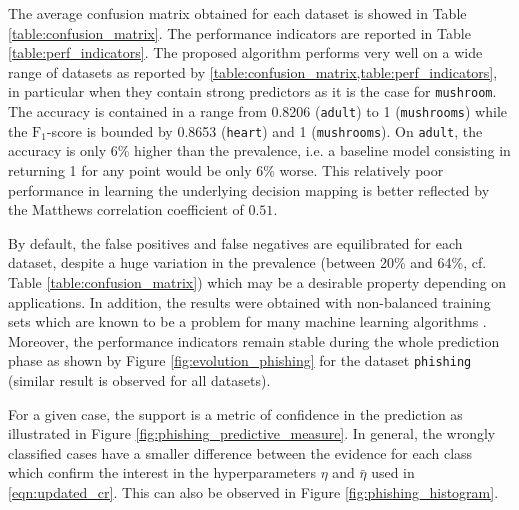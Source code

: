 \documentclass[preprint,12pt]{elsarticle}
\theoremstyle{definition}
\begin{document}
The average confusion matrix obtained for each dataset is showed in Table \ref{table:confusion_matrix}. The performance indicators are reported in Table \ref{table:perf_indicators}. The proposed algorithm performs very well on a wide range of datasets as reported by \cref{table:confusion_matrix,table:perf_indicators}, in particular when they contain strong predictors as it is the case for \texttt{mushroom}. The accuracy is contained in a range from 0.8206 (\texttt{adult}) to 1 (\texttt{mushrooms}) while the $\text{F}_1$-score is bounded by 0.8653 (\texttt{heart}) and 1 (\texttt{mushrooms}). On \texttt{adult}, the accuracy is only 6\% higher than the prevalence, i.e. a baseline model consisting in returning 1 for any point would be only 6\% worse. This relatively poor performance in learning the underlying decision mapping is better reflected by the Matthews correlation coefficient of $0.51$.

By default, the false positives and false negatives are equilibrated for each dataset, despite a huge variation in the prevalence (between 20\% and 64\%, cf. Table \ref{table:confusion_matrix}) which may be a desirable property depending on applications. In addition, the results were obtained with non-balanced training sets which are known to be a problem for many machine learning algorithms \cite{He:2009:LID:1591901.1592322}. Moreover, the performance indicators remain stable during the whole prediction phase as shown by Figure \ref{fig:evolution_phishing} for the dataset \texttt{phishing} (similar result is observed for all datasets).

For a given case, the support is a metric of confidence in the prediction as illustrated in Figure \ref{fig:phishing_predictive_measure}. In general, the wrongly classified cases have a smaller difference between the evidence for each class which confirm the interest in the hyperparameters $\eta$ and $\bar \eta$ used in \eqref{eqn:updated_cr}. This can also be observed in Figure \ref{fig:phishing_histogram}.
\end{document}
